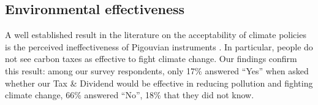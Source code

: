 \documentclass[12pt]{article} %
\begin{document}



    \subsection{Environmental effectiveness}

A well established result in the literature on the acceptability of climate policies is the perceived ineffectiveness of Pigouvian instruments \citep[e.g.][]{dresner_social_2006,kallbekken_et_al_2011, baranzini_effectiveness_2017}. In particular, people do not see carbon taxes as effective to fight climate change. Our findings confirm this result: among our survey respondents, only 17\% answered ``Yes'' when asked whether our Tax \& Dividend would be effective in reducing pollution and fighting climate change, 66\% answered ``No'', 18\% that they did not know.
\end{document}
